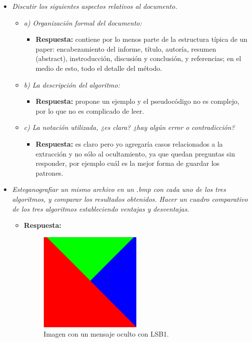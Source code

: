 \documentclass[a4paper,12pt]{article}
\def\FIG#1#2{%
	{\centering#1\par}
	#2}
\begin{document}
	\begin{itemize}
		\item \textit{Discutir los siguientes aspectos relativos al documento.}
		\begin{itemize}
			\item \textit{a) Organización formal del documento:}
			\begin{itemize}
				\item \textbf{Respuesta:} contiene por lo menos parte de la estructura típica de un paper: encabezamiento del informe, título, autoría, resumen (abstract), instroducción, discusión y conclusión, y referencias; en el medio de esto, todo el detalle del método. 
			\end{itemize}
			
			\item \textit{b) La descripción del algoritmo:}
			\begin{itemize}
				\item \textbf{Respuesta:} propone un ejemplo y el pseudocódigo no es complejo, por lo que no es complicado de leer.
			\end{itemize}
			
			\item \textit{c) La notación utilizada, ¿es clara? ¿hay algún error o contradicción?}
			\begin{itemize}
				\item \textbf{Respuesta:} es claro pero yo agregaría casos relacionados a la extracción y no sólo al ocultamiento, ya que quedan preguntas sin responder, por ejemplo cuál es la mejor forma de guardar los patrones. 
			\end{itemize}
		\end{itemize}
		
		\item \textit{Esteganografiar un mismo archivo en un .bmp con cada uno de los tres algoritmos, y comparar los resultados obtenidos. Hacer un cuadro comparativo de los tres algoritmos estableciendo ventajas y desventajas.}
		\begin{itemize}
			\item \textbf{Respuesta:} 
			
			\begin{figure}[h!]%
				\FIG{\includegraphics[width=0.5\textwidth]{tricolor_lsb1.png}}
				{\caption{Imagen con un mensaje oculto con LSB1.}
					\label{fig1}}
			\end{figure}
		

\end{itemize}
\end{itemize}
\end{document}
